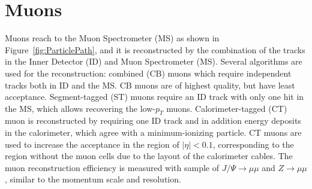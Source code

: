 \begin{table}[ht]
 \label{tab:electron_selection}
 \caption{Summary of electron selection used in this analysis}
\end{table}

\section{Muons}
Muons reach to the Muon Spectrometer (MS) as shown in Figure~\ref{fig:ParticlePath}, and it is reconstructed by the combination of the tracks in the Inner Detector (ID) and Muon Spectrometer (MS). 
Several algorithms are used for the reconstruction: 
combined (CB) muons which require independent tracks both in ID and the MS. CB muons are of highest quality, but have least acceptance. 
Segment-tagged (ST) muons require an ID track with only one hit in the MS, which allows recovering the low-$p_T$ muons. 
Calorimeter-tagged (CT) muon is reconstructed by requiring one ID track and in addition energy deposits in the calorimeter, which agree with a minimum-ionizing particle. CT muons are used to increase the acceptance in the region of $|\eta| < 0.1$, corresponding to the region without the muon cells due to the layout of the calorimeter cables. 
The muon reconstruction efficiency is measured with sample of $J/\Psi \rightarrow \mu\mu$ and $Z\rightarrow \mu\mu$, similar to the momentum scale and resolution.

